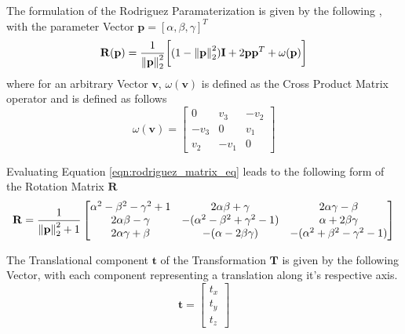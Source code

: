 The formulation of the Rodriguez Paramaterization is given by the following 
\cite{Shuster1993}, with the parameter Vector
$\mathbf{p} = [\alpha, \beta, \gamma]^{T}$
\begin{equation}
  \label{eqn:rodriguez_matrix_eq}
  \mathbf{R}(\mathbf{p}) =
  \frac{1}{\left\lVert\mathbf{p}\right\rVert_{2}^{2}}
  \bigg[
  (1 - \left\lVert\mathbf{p}\right\rVert_{2}^{2})\mathbf{I} +
  2 \mathbf{pp}^{T} + \omega(\mathbf{p})
  \bigg]
\end{equation}
where for an arbitrary Vector $\mathbf{v}$, $\omega(\mathbf{v})$ is defined as
the Cross Product Matrix operator and is defined as follows
\begin{equation}
  \label{eqn:cross_prod_mat}
  \omega(\mathbf{v}) =
  \begin{bmatrix}
    0 & v_{3} & -v_{2} \\
    -v_{3} & 0 & v_{1} \\
    v_{2} & -v_{1} & 0
  \end{bmatrix}
\end{equation}

Evaluating Equation \ref{eqn:rodriguez_matrix_eq} leads to the following form
of the Rotation Matrix $\mathbf{R}$
\begin{equation}
  \label{eqn:rodriguez_matrix}
  \mathbf{R} = \frac{1}{\left\lVert\mathbf{p}\right\rVert_{2}^{2} + 1}
  \begin{bmatrix}
    \alpha^{2} - \beta^{2} - \gamma^{2} + 1 &
    2 \alpha \beta + \gamma &
    2 \alpha \gamma - \beta \\
    2 \alpha \beta - \gamma &
    -(\alpha^{2} - \beta^{2} + \gamma^{2} - 1) &
    \alpha + 2 \beta \gamma \\
    2 \alpha \gamma + \beta &
    -(\alpha - 2 \beta \gamma) &
    -(\alpha^{2} + \beta^{2} - \gamma^{2} - 1)
  \end{bmatrix}
\end{equation}

The Translational component $\mathbf{t}$ of the Transformation $\mathbf{T}$ is
given by the following Vector, with each component representing a translation
along it's respective axis.
\begin{equation}
  \label{eqn:trans_vector}
  \mathbf{t} =
  \begin{bmatrix}
    t_{x} \\
    t_{y} \\
    t_{z}
  \end{bmatrix}
\end{equation}

